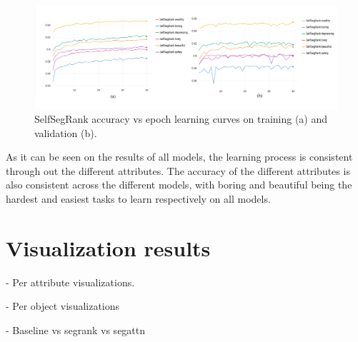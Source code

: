\begin{figure}[ht]
	\begin{center}
	\includegraphics[width=1\textwidth]{./figures/selfsegrank_graph.png}
	\caption[SelfSegRank Training curves]{
        SelfSegRank accuracy vs epoch learning curves on training (a) and validation (b).
        }
	\label{fig:selfsegrank_graph}
	\end{center}
\end{figure}

As it can be seen on the results of all models, the learning process is consistent through out
the different attributes. The accuracy of the different attributes is also consistent across the
different models, with boring and beautiful being the hardest and easiest tasks to learn respectively
on all models.


\section{Visualization results}
\label{sec:visualization_results}

- Per attribute visualizations.

- Per object visualizations

- Baseline vs segrank vs segattn
